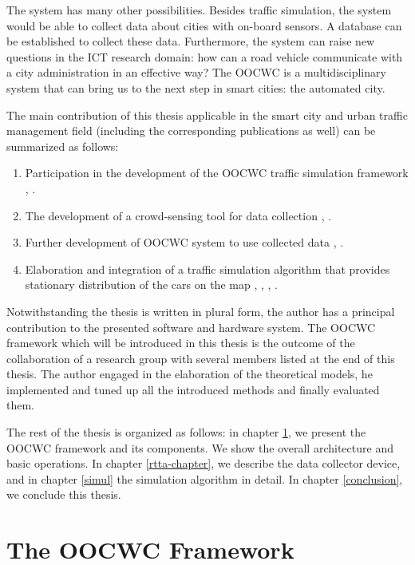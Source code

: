 \documentclass[b5paper,12pt]{report}
\theoremstyle{definition}
\begin{document}
The system has many other possibilities. Besides traffic simulation, the system would be able to collect data about cities with on-board sensors. A database can be established to collect these data. Furthermore, the system can raise new questions in the ICT research domain: how can a road vehicle communicate with a city administration in an effective way? The OOCWC is a multidisciplinary system that can bring us to the next step in smart cities: the automated city.

The main contribution of this thesis applicable in the smart city and urban traffic management field (including the corresponding publications as well) can be summarized as follows:

\begin{enumerate}
  \item Participation in the development of the OOCWC traffic simulation framework \cite{7231223}, \cite{infocomjournal}.
  \item The development of a crowd-sensing tool for data collection \cite[/real-time-traffic-analyzer/]{csts-repo}, \cite{usingcoginfocom}.
  \item Further development of OOCWC system to use collected data \cite{infocomjournal}, \cite{csts-repo}.
  \item Elaboration and integration of a traffic simulation algorithm that provides stationary distribution of the cars on the map \cite{traffic-paper}, \cite{markov-traffic-paper} \cite{dssv-talk}, \cite{zeg-talk}, \cite[/justine/]{csts-repo}.
\end{enumerate}

Notwithstanding the thesis is written in plural form, the author has a principal contribution to the presented software and hardware system. The OOCWC framework which will be introduced in this thesis is the outcome of the collaboration of a research group with several members listed at the end of this thesis. The author engaged in the elaboration of the theoretical models, he implemented and tuned up all the introduced methods and finally evaluated them.

The rest of the thesis is organized as follows: in chapter \ref{oocwc}, we present the OOCWC framework and its components. We show the overall architecture and basic operations. In chapter \ref{rtta-chapter}, we describe the data collector device, and in chapter \ref{simul} the simulation algorithm in detail. In chapter \ref{conclusion}, we conclude this thesis.

\chapter{The OOCWC Framework}
\label{oocwc}
\end{document}
